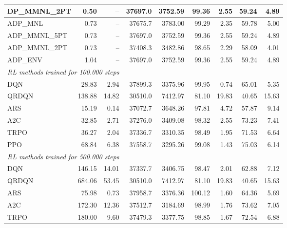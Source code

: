 \begin{samepage}
\begin{center}
\begin{tabular}{l|rr|rr|rr|rr}
    DP\_MMNL\_2PT &     0.50 &    -- &    37697.0 &    3752.59 &   99.36 &    2.55 &   59.24 &    4.89 \\
    \midrule
    ADP\_MNL     &     0.73 &    -- &    37675.7 &    3783.00 &   99.29 &    2.35 &   59.78 &    5.00 \\
    ADP\_MMNL\_5PT &     0.73 &    -- &    37697.0 &    3752.59 &   99.36 &    2.55 &   59.24 &    4.89 \\
    ADP\_MMNL\_2PT &     0.73 &    -- &    37408.3 &    3482.86 &   98.65 &    2.29 &   58.09 &    4.01 \\
    ADP\_ENV     &     1.04 &    -- &    37697.0 &    3752.59 &   99.36 &    2.55 &   59.24 &    4.89 \\
    \midrule
    \multicolumn{9}{l}{\textit{RL methods trained for 100.000 steps}} \\
    \midrule
    DQN          &    28.83 &     2.94 &    37899.3 &    3375.96 &   99.95 &    0.74 &   65.01 &    5.35 \\
    QRDQN        &   138.88 &    14.82 &    30510.0 &    7412.97 &   81.10 &   19.83 &   40.65 &   15.63 \\
    ARS          &    15.19 &     0.14 &    37072.7 &    3648.26 &   97.81 &    4.72 &   57.87 &    9.14 \\
    A2C          &    32.85 &     2.71 &    37276.0 &    3409.08 &   98.32 &    2.55 &   73.23 &    7.41 \\
    TRPO         &    36.27 &     2.04 &    37336.7 &    3310.35 &   98.49 &    1.95 &   71.53 &    6.64 \\
    PPO          &    68.84 &     6.38 &    37558.7 &    3295.26 &   99.08 &    1.43 &   75.03 &    6.14 \\
    \midrule
    \multicolumn{9}{l}{\textit{RL methods trained for 500.000 steps}} \\
    \midrule
    DQN          &   146.15 &    14.01 &    37337.7 &    3406.75 &   98.47 &    2.01 &   62.88 &    7.12 \\
    QRDQN        &   684.06 &    53.45 &    30510.0 &    7412.97 &   81.10 &   19.83 &   40.65 &   15.63 \\
    ARS          &    75.98 &     0.73 &    37958.7 &    3376.36 &  100.12 &    1.60 &   64.36 &    5.69 \\
    A2C          &   172.30 &    12.36 &    37512.7 &    3184.69 &   98.99 &    1.76 &   73.62 &    7.05 \\
    TRPO         &   180.00 &     9.60 &    37479.3 &    3377.75 &   98.85 &    1.67 &   72.54 &    6.88 \\

\end{tabular}
\end{center}
\end{samepage}
